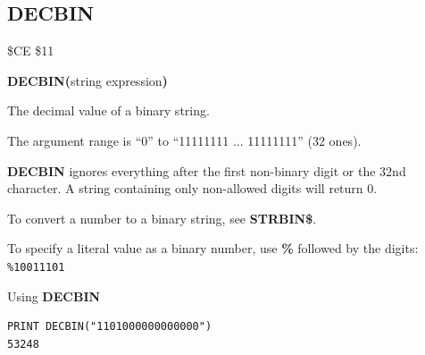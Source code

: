 \subsection{DECBIN}
\begin{description}[leftmargin=2cm,style=nextline]
\item [Token:]    \$CE \$11

\item [Format:]   {\bf DECBIN(}string expression{\bf)}

\item [Returns:]  The decimal value of a binary string.

                  The argument range is ``0'' to ``11111111 ... 11111111'' (32 ones).

\item [Remarks:]  {\bf DECBIN} ignores everything after the first non-binary digit or the 32nd character. A string containing only non-allowed digits will return 0.

                  To convert a number to a binary string, see {\bf STRBIN\$}.

                  To specify a literal value as a binary number, use {\bf \%} followed by the digits: \texttt{\%10011101}

\item [Example:]  Using {\bf DECBIN}

\begin{tcolorbox}[colback=black,coltext=white]
\verbatimfont{\codefont}
\begin{verbatim}
PRINT DECBIN("1101000000000000")
53248
\end{verbatim}
\end{tcolorbox}
\end{description}


\newpage
